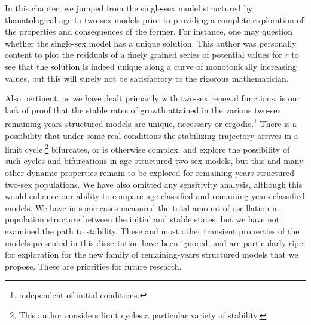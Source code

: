 \FloatBarrier
In this chapter, we jumped from the single-sex model structured by
thanatological age to two-sex models prior to providing a complete
exploration of the properties and consequences of the former. For instance, one
may question whether the single-sex model has a unique solution. This author was
personally content to plot the residuals of a finely grained series of potential
values for $r$ to see that the solution is indeed unique along a curve of
monotonically increasing values, but this will surely not be satisfactory to the
rigorous mathematician.

Also pertinent, as we have dealt primarily with two-sex renewal functions,
is our lack of proof that the stable rates of growth attained in the
various two-sex remaining-years structured models are unique, necessary or
ergodic.\footnote{independent 
of initial conditions.} There is a possibility that under some real conditions
the stabilizing trajectory arrives in a limit cycle,\footnote{This author considers 
limit cycles a particular variety of stability.} bifurcates, or is
otherwise complex. \citet{wijewickrema1980weak} and \citet{chung1990phd, chung1994cycles}
explore the possibility of such cycles and bifurcations in age-structured
two-sex models, but this and many other dynamic properties remain to be explored for 
remaining-years structured two-sex populations. We have also omitted any
sensitivity analysis, although this would enhance our ability to compare age-classified 
and remaining-years classified models. We have in some cases measured the total
amount of oscillation in population structure between the initial and stable states, but
we have not examined the path to stability. These and most
other transient properties of the models presented in this dissertation have
been ignored, and are particularly ripe for exploration for the new family of
remaining-years structured models that we propose. These are priorities for
future research.

